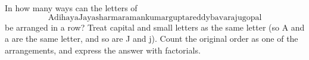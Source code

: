 In how many ways can the letters of
\[\text{AdihayaJayasharmaramankumarguptareddybavarajugopal}\]
be arranged in a row? Treat capital and small letters as the same letter (so A and a are the same letter, and so are J and j). Count the original order as one of the arrangements, and express the answer with factorials.
